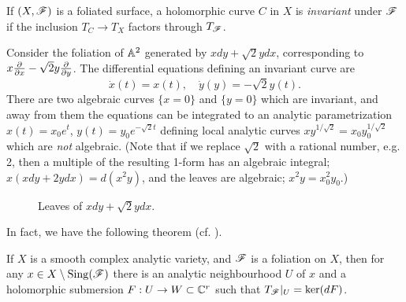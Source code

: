 \begin{definition}
    If $(X,\mathscr{F})$ is a foliated surface, a holomorphic curve $C$ in $X$ is
    \emph{invariant} under $\mathscr{F}$ if the inclusion $T_C\to T_X$ factors through
    $T_{\mathscr{F}}$.
\end{definition}

\begin{example}\label{ex:irrational}
    Consider the foliation of $\mathbb{A}^2$ generated by $xdy+\sqrt2ydx$, corresponding
    to $x\pdv{}{x}-\sqrt2y\pdv{}{y}$. The differential equations defining an
    invariant curve are
    \begin{equation*}
        \dot x(t) = x(t), \quad \dot y(y)=-\sqrt2y(t).
    \end{equation*}
    There are two algebraic curves $\{x=0\}$ and $\{y=0\}$ which are invariant,
    and away from them the equations can be integrated to an analytic
    parametrization $x(t)=x_0e^t$, $y(t)=y_0e^{-\sqrt2t}$ defining local
    analytic curves $xy^{1/\sqrt2}=x_0y_0^{1/\sqrt2}$ which are \emph{not}
    algebraic. (Note that if we replace $\sqrt2$ with a rational number, e.g. 2,
    then a multiple of the resulting 1-form has an algebraic integral;
    $x(xdy+2ydx)=d(x^2y)$, and the leaves are algebraic; $x^2y=x_0^2y_0$.)
    \begin{figure}[H]
        \centering
        \caption{Leaves of $xdy+\sqrt{2}ydx$.}
        \label{fig:irrational}
    \end{figure}
\end{example}

In fact, we have the following theorem (cf. \cite[Thm 2.20]{voisin_book}).

\begin{theorem}[Frobenius]\label{thm:frobenius}
    If $X$ is a smooth complex analytic variety, and $\mathscr{F}$ is a foliation on
    $X$, then for any $x\in X\setminus\operatorname{Sing}(\mathscr{F})$ there is an analytic
    neighbourhood $U$ of $x$ and a holomorphic submersion $F:U\to W\subset\mathbb{C}^r$
    such that $T_{\mathscr{F}}|_U=\ker(dF)$.
\end{theorem}

